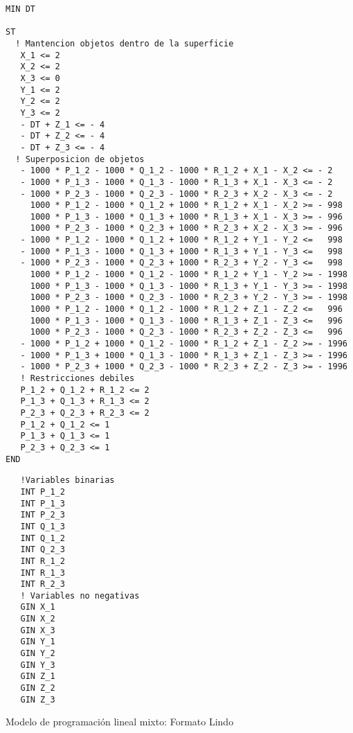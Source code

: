 \begin{table}[!htb]
\scriptsize
\begin{verbatim}
MIN DT

ST
  ! Mantencion objetos dentro de la superficie
   X_1 <= 2
   X_2 <= 2
   X_3 <= 0
   Y_1 <= 2
   Y_2 <= 2
   Y_3 <= 2
   - DT + Z_1 <= - 4
   - DT + Z_2 <= - 4
   - DT + Z_3 <= - 4
  ! Superposicion de objetos
   - 1000 * P_1_2 - 1000 * Q_1_2 - 1000 * R_1_2 + X_1 - X_2 <= - 2
   - 1000 * P_1_3 - 1000 * Q_1_3 - 1000 * R_1_3 + X_1 - X_3 <= - 2
   - 1000 * P_2_3 - 1000 * Q_2_3 - 1000 * R_2_3 + X_2 - X_3 <= - 2
     1000 * P_1_2 - 1000 * Q_1_2 + 1000 * R_1_2 + X_1 - X_2 >= - 998
     1000 * P_1_3 - 1000 * Q_1_3 + 1000 * R_1_3 + X_1 - X_3 >= - 996
     1000 * P_2_3 - 1000 * Q_2_3 + 1000 * R_2_3 + X_2 - X_3 >= - 996
   - 1000 * P_1_2 - 1000 * Q_1_2 + 1000 * R_1_2 + Y_1 - Y_2 <=   998
   - 1000 * P_1_3 - 1000 * Q_1_3 + 1000 * R_1_3 + Y_1 - Y_3 <=   998
   - 1000 * P_2_3 - 1000 * Q_2_3 + 1000 * R_2_3 + Y_2 - Y_3 <=   998
     1000 * P_1_2 - 1000 * Q_1_2 - 1000 * R_1_2 + Y_1 - Y_2 >= - 1998
     1000 * P_1_3 - 1000 * Q_1_3 - 1000 * R_1_3 + Y_1 - Y_3 >= - 1998
     1000 * P_2_3 - 1000 * Q_2_3 - 1000 * R_2_3 + Y_2 - Y_3 >= - 1998
     1000 * P_1_2 - 1000 * Q_1_2 - 1000 * R_1_2 + Z_1 - Z_2 <=   996
     1000 * P_1_3 - 1000 * Q_1_3 - 1000 * R_1_3 + Z_1 - Z_3 <=   996
     1000 * P_2_3 - 1000 * Q_2_3 - 1000 * R_2_3 + Z_2 - Z_3 <=   996
   - 1000 * P_1_2 + 1000 * Q_1_2 - 1000 * R_1_2 + Z_1 - Z_2 >= - 1996
   - 1000 * P_1_3 + 1000 * Q_1_3 - 1000 * R_1_3 + Z_1 - Z_3 >= - 1996
   - 1000 * P_2_3 + 1000 * Q_2_3 - 1000 * R_2_3 + Z_2 - Z_3 >= - 1996
   ! Restricciones debiles
   P_1_2 + Q_1_2 + R_1_2 <= 2
   P_1_3 + Q_1_3 + R_1_3 <= 2
   P_2_3 + Q_2_3 + R_2_3 <= 2
   P_1_2 + Q_1_2 <= 1
   P_1_3 + Q_1_3 <= 1
   P_2_3 + Q_2_3 <= 1
END
\end{verbatim}
\end{table}
\pagebreak

\begin{table}[!htb]
\scriptsize
\begin{verbatim}
   !Variables binarias
   INT P_1_2
   INT P_1_3
   INT P_2_3
   INT Q_1_3
   INT Q_1_2
   INT Q_2_3
   INT R_1_2
   INT R_1_3
   INT R_2_3
   ! Variables no negativas
   GIN X_1
   GIN X_2
   GIN X_3
   GIN Y_1
   GIN Y_2
   GIN Y_3
   GIN Z_1
   GIN Z_2
   GIN Z_3
\end{verbatim}
\caption{Modelo de programación lineal mixto: Formato Lindo}
\label{tab:table_1}
\end{table}


